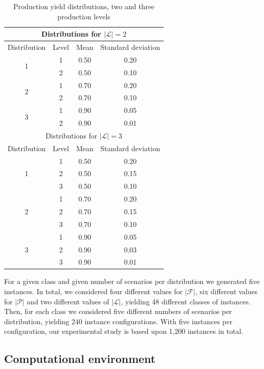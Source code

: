 \documentclass[12pt]{article}
\theoremstyle{thmstylethree}%
\begin{document}
\begin{table}[htp]
\small
\center
\begin{tabular}{|c|c|c|c|}
\hline
\multicolumn{4}{|c|}{Distributions for $\vert \mathcal{L} \vert = 2$} \\
\hline
Distribution & Level & Mean & Standard deviation \\
\hline
\multirow{2}{*}{1} & 1 & 0.50 & 0.20 \\
 & 2 & 0.50 & 0.10 \\
\multirow{2}{*}{2} & 1 & 0.70 & 0.20 \\
 & 2 & 0.70 & 0.10 \\
\multirow{2}{*}{3} & 1 & 0.90 & 0.05 \\
 & 2 & 0.90 & 0.01 \\
\hline
\multicolumn{4}{|c|}{Distributions for $\vert \mathcal{L} \vert = 3$} \\
\hline
Distribution & Level & Mean & Standard deviation \\
\hline
\multirow{3}{*}{1} & 1 & 0.50 & 0.20 \\
 & 2 & 0.50 & 0.15 \\
 & 3 & 0.50 & 0.10 \\
\multirow{3}{*}{2} & 1 & 0.70 & 0.20 \\
 & 2 & 0.70 & 0.15 \\
 & 3 & 0.70 & 0.10 \\
\multirow{3}{*}{3} & 1 & 0.90 & 0.05 \\
 & 2 & 0.90 & 0.03 \\
 & 3 & 0.90 & 0.01 \\
\hline
\end{tabular}
\caption{Production yield distributions, two and three production levels}
\label{tbl:yield_dists}
\end{table}

For a given class and given number of scenarios per distribution we generated five instances. In total, we considered four different values for $\vert \mathcal{F} \vert$, six different values for $\vert \mathcal{P} \vert$ and two different values of $\vert \mathcal{L} \vert$, yielding 48 different classes of instances. Then, for each class we considered five different numbers of scenarios per distribution, yielding 240 instance configurations. With five instances per configuration, our experimental study is based upon 1,200 instances in total. 


\subsection{Computational environment}
\label{subsec:comp_environment}
\end{document}
